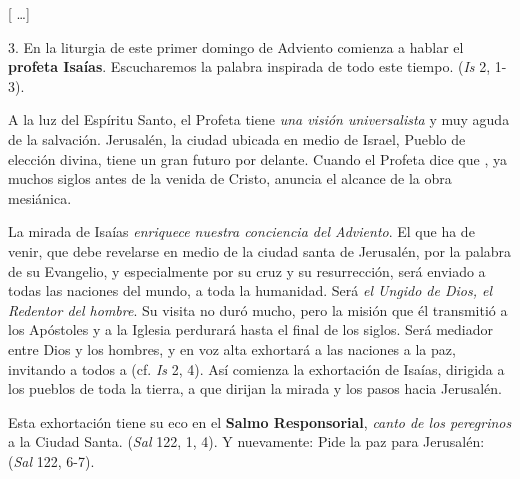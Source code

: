 \begin{body}
\begin{body}
		{[} \ldots{}{]}
		
		3. En la liturgia de este primer domingo de Adviento comienza a hablar el \textbf{profeta Isaías}. Escucharemos la palabra inspirada de todo este tiempo.  (\emph{Is} 2, 1-3).
		
		A la luz del Espíritu Santo, el Profeta tiene \emph{una visión universalista} y muy aguda de la salvación. Jerusalén, la ciudad ubicada en medio de Israel, Pueblo de elección divina, tiene un gran futuro por delante. Cuando el Profeta dice que , ya muchos siglos antes de la venida de Cristo, anuncia el alcance de la obra mesiánica.
		
		La mirada de Isaías \emph{enriquece nuestra conciencia del Adviento}. El que ha de venir, que debe revelarse  en medio de la ciudad santa de Jerusalén, por la palabra de su Evangelio, y especialmente por su cruz y su resurrección, será enviado a todas las naciones del mundo, a toda la humanidad. Será \emph{el Ungido de Dios, el Redentor del hombre}. Su visita no duró mucho, pero la misión que él transmitió a los Apóstoles y a la Iglesia perdurará hasta el final de los siglos. Será mediador entre Dios y los hombres, y en voz alta exhortará a las naciones a la paz, invitando a todos a  (cf. \emph{Is} 2, 4). Así comienza la exhortación de Isaías, dirigida a los pueblos de toda la tierra, a que dirijan la mirada y los pasos hacia Jerusalén.
		
		Esta exhortación tiene su eco en el \textbf{Salmo Responsorial}, \emph{canto de los peregrinos} a la Ciudad Santa.  (\emph{Sal} 122, 1, 4). Y nuevamente: Pide la paz para Jerusalén:  (\emph{Sal} 122, 6-7).
		

\end{body}
\end{body}
